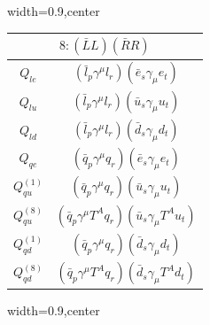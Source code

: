 \begin{table}[H]
\begin{center}
\begin{adjustbox}{width=0.9\textwidth,center}
\begin{minipage}[t]{4.75cm}
\begin{tabular}[t]{c|c}
\multicolumn{2}{c}{\boldmath$8:(\bar L L)(\bar R R)$} \\
\hline
$Q_{le}$               & $(\bar l_p \gamma^\mu l_r)(\bar e_s \gamma_\mu e_t)$ \\
%
$Q_{lu}$               & $(\bar l_p \gamma^\mu l_r)(\bar u_s \gamma_\mu u_t)$ \\
%
$Q_{ld}$               & $(\bar l_p \gamma^\mu l_r)(\bar d_s \gamma_\mu d_t)$ \\
%
$Q_{qe}$               & $(\bar q_p \gamma^\mu q_r)(\bar e_s \gamma_\mu e_t)$ \\
%
$Q_{qu}^{(1)}$         & $(\bar q_p \gamma^\mu q_r)(\bar u_s \gamma_\mu u_t)$ \\ 
%
$Q_{qu}^{(8)}$         & $(\bar q_p \gamma^\mu T^A q_r)(\bar u_s \gamma_\mu T^A u_t)$ \\ 
%
$Q_{qd}^{(1)}$ & $(\bar q_p \gamma^\mu q_r)(\bar d_s \gamma_\mu d_t)$ \\
%
$Q_{qd}^{(8)}$ & $(\bar q_p \gamma^\mu T^A q_r)(\bar d_s \gamma_\mu T^A d_t)$\\
\end{tabular}
\end{minipage}

\end{adjustbox}

\vspace{0.25cm}

\begin{adjustbox}{width=0.9\textwidth,center}


\end{adjustbox}
\end{center}
\end{table}
